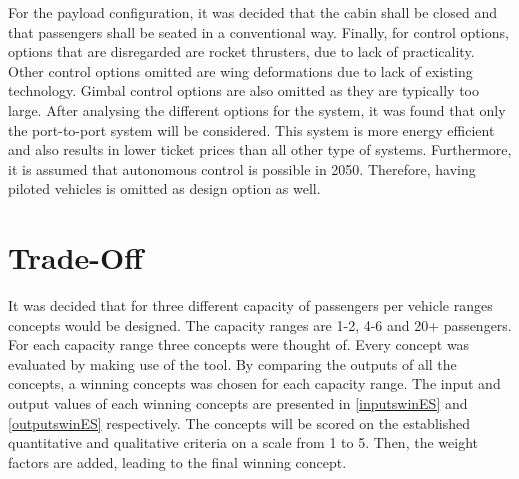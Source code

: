 For the payload configuration, it was decided that the cabin shall be closed and that passengers shall be seated in a conventional way. Finally, for control options, options that are disregarded are rocket thrusters, due to lack of practicality. Other control options omitted are wing deformations due to lack of existing technology. Gimbal control options are also omitted as they are typically too large. 
After analysing the different options for the system, it was found that only the port-to-port system will be considered. This system is more energy efficient and also results in lower ticket prices than all other type of systems. Furthermore, it is assumed that autonomous control is possible in 2050. Therefore, having piloted vehicles is omitted as design option as well.

\section{Trade-Off}
It was decided that for three different capacity of passengers per vehicle ranges concepts would be designed. The capacity ranges are 1-2, 4-6 and 20+ passengers. For each capacity range three concepts were thought of. Every concept was evaluated by making use of the tool. By comparing the outputs of all the concepts, a winning concepts was chosen for each capacity range. The input and output values of each winning concepts are presented in \autoref{inputswinES} and \autoref{outputswinES} respectively. The concepts will be scored on the established quantitative and qualitative criteria on a scale from 1 to 5. Then, the weight factors are added, leading to the final winning concept. 

